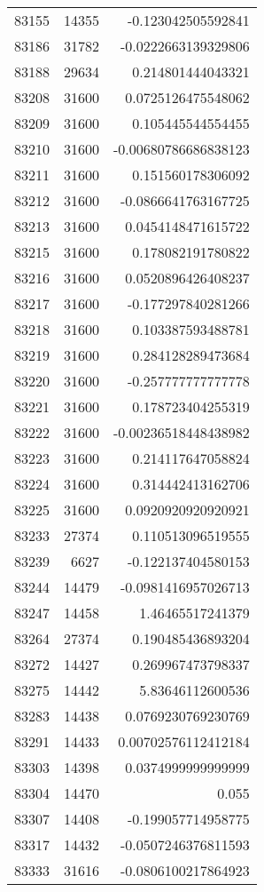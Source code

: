 \begin{tabular}{r | r | r}
83155 & 14355 & -0.123042505592841 \\
83186 & 31782 & -0.0222663139329806 \\
83188 & 29634 & 0.214801444043321 \\
83208 & 31600 & 0.0725126475548062 \\
83209 & 31600 & 0.105445544554455 \\
83210 & 31600 & -0.00680786686838123 \\
83211 & 31600 & 0.151560178306092 \\
83212 & 31600 & -0.0866641763167725 \\
83213 & 31600 & 0.0454148471615722 \\
83215 & 31600 & 0.178082191780822 \\
83216 & 31600 & 0.0520896426408237 \\
83217 & 31600 & -0.177297840281266 \\
83218 & 31600 & 0.103387593488781 \\
83219 & 31600 & 0.284128289473684 \\
83220 & 31600 & -0.257777777777778 \\
83221 & 31600 & 0.178723404255319 \\
83222 & 31600 & -0.00236518448438982 \\
83223 & 31600 & 0.214117647058824 \\
83224 & 31600 & 0.314442413162706 \\
83225 & 31600 & 0.0920920920920921 \\
83233 & 27374 & 0.110513096519555 \\
83239 & 6627 & -0.122137404580153 \\
83244 & 14479 & -0.0981416957026713 \\
83247 & 14458 & 1.46465517241379 \\
83264 & 27374 & 0.190485436893204 \\
83272 & 14427 & 0.269967473798337 \\
83275 & 14442 & 5.83646112600536 \\
83283 & 14438 & 0.0769230769230769 \\
83291 & 14433 & 0.00702576112412184 \\
83303 & 14398 & 0.0374999999999999 \\
83304 & 14470 & 0.055 \\
83307 & 14408 & -0.199057714958775 \\
83317 & 14432 & -0.0507246376811593 \\
83333 & 31616 & -0.0806100217864923 \\

\end{tabular}
